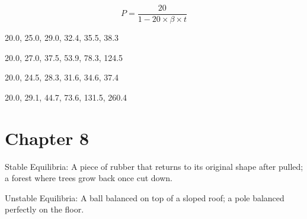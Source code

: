 \documentclass[]{memoir}
\begin{document}
\[ P = \frac{20}{1 - 20 \times \beta \times t }\]


20.0, 25.0, 29.0, 32.4, 35.5, 38.3


20.0, 27.0, 37.5, 53.9, 78.3, 124.5


20.0, 24.5, 28.3, 31.6, 34.6, 37.4


20.0, 29.1, 44.7, 73.6, 131.5, 260.4

\section{Chapter 8}


Stable Equilibria: A piece of rubber that returns to its original shape
after pulled; a forest where trees grow back once cut down.

Unstable Equilibria: A ball balanced on top of a sloped roof; a pole
balanced perfectly on the floor.

\end{document}
